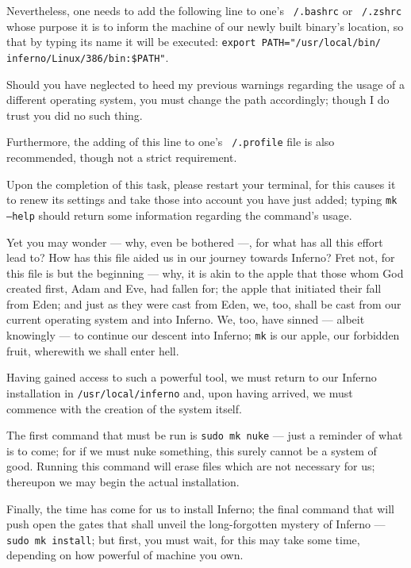 \documentclass[a5paper,twoside,12pt]{report}
\begin{document}
  Nevertheless, one needs to add the following line to one's \texttt{~/.bashrc} or \texttt{~/.zshrc} whose purpose it is to inform the machine of our newly built binary's location, so that by typing its name it will be executed: \texttt{export PATH="/usr/local/bin/\\inferno/Linux/386/bin:\$PATH"}.

  Should you have neglected to heed my previous warnings regarding the usage of a different operating system, you must change the path accordingly; though I do trust you did no such thing.

  Furthermore, the adding of this line to one's \texttt{~/.profile} file is also recommended, though not a strict requirement.

  Upon the completion of this task, please restart your terminal, for this causes it to renew its settings and take those into account you have just added; typing \texttt{mk --help} should return some information regarding the command's usage.

  Yet you may wonder — why, even be bothered —, for what has all this effort lead to? How has this file aided us in our journey towards Inferno? Fret not, for this file is but the beginning — why, it is akin to the apple that those whom God created first, Adam and Eve, had fallen for; the apple that initiated their fall from Eden; and just as they were cast from Eden, we, too, shall be cast from our current operating system and into Inferno. We, too, have sinned — albeit knowingly — to continue our descent into Inferno; \texttt{mk} is our apple, our forbidden fruit, wherewith we shall enter hell.

  Having gained access to such a powerful tool, we must return to our Inferno installation in \texttt{/usr/local/inferno} and, upon having arrived, we must commence with the creation of the system itself.

  The first command that must be run is \texttt{sudo mk nuke} — just a reminder of what is to come; for if we must nuke something, this surely cannot be a system of good. Running this command will erase files which are not necessary for us; thereupon we may begin the actual installation.

  Finally, the time has come for us to install Inferno; the final command that will push open the gates that shall unveil the long-forgotten mystery of Inferno — \texttt{sudo mk install}; but first, you must wait, for this may take some time, depending on how powerful of machine you own.
  \newpage
\end{document}
